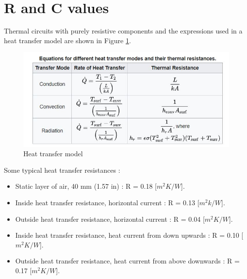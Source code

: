 \section{R and C values}

Thermal circuits with purely resistive components and the expressions used in a heat transfer model are shown in Figure \ref{fig:htr}.
\begin{figure}[H]
	\centering
	\includegraphics[width=0.8\columnwidth]{Pictures/heat transfer mode.JPG}
	\caption[Short title]{Heat transfer model\cite{GIGO}}
	\label{fig:htr}
	\end{figure}
	
Some typical heat transfer resistances \cite{HeatTransfer}: 

\begin{itemize}
    \item Static layer of air, 40 mm (1.57 in)  : R = 0.18 [$m^2K/W$].
    \item Inside heat transfer resistance, horizontal current : R = 0.13 [$m^2k/W$]. 
    \item Outside heat transfer resistance, horizontal current : R = 0.04 [$m^2K/W$].
    \item Inside heat transfer resistance, heat current from down upwards : R = 0.10 [$m^2K/W$].
    \item Outside heat transfer resistance, heat current from above downwards : R = 0.17 [$m^2K/W$].

\end{itemize}

